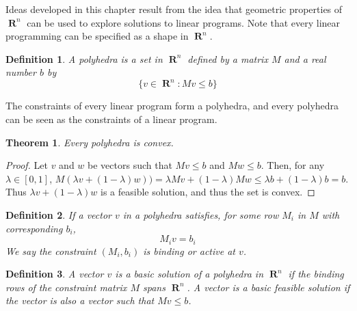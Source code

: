 \documentclass{report}
\DeclareMathOperator{\real}{\mathbf{R}}
\newtheorem{definition}{Definition}
\newtheorem{theorem}{Theorem}[chapter]
\begin{document}
    Ideas developed in this chapter result from the idea that geometric properties of $\real^n$ can be used to explore solutions to linear programs. Note that every linear programming can be specified as a shape in $\real^n$.

    \begin{definition}
        A polyhedra is a set in $\real^n$ defined by a matrix $M$ and a real number $b$ by
        \[ \{ v \in \real^n : Mv \leq b \} \]
    \end{definition}

    The constraints of every linear program form a polyhedra, and every polyhedra can be seen as the constraints of a linear program.

    \begin{theorem}
        Every polyhedra is convex.
    \end{theorem}
    \begin{proof}
        Let $v$ and $w$ be vectors such that $Mv \leq b$ and $Mw \leq b$. Then, for any $\lambda \in [0,1]$, $M(\lambda v + (1 - \lambda) w)) = \lambda Mv + (1 - \lambda)Mw \leq \lambda b + (1 - \lambda) b = b$. Thus $\lambda v + (1 - \lambda) w$ is a feasible solution, and thus the set is convex.
    \end{proof}

    \begin{definition}
        If a vector $v$ in a polyhedra satisfies, for some row $M_i$ in $M$ with corresponding $b_i$,
        \[ M_iv = b_i \]
        We say the constraint $(M_i,b_i)$ is binding or active at $v$.
    \end{definition}

    \begin{definition}
        A vector $v$ is a basic solution of a polyhedra in $\real^n$ if the binding rows of the constraint matrix $M$ spans $\real^n$. A vector is a basic feasible solution if the vector is also a vector such that $Mv \leq b$.
    \end{definition}
\end{document}
